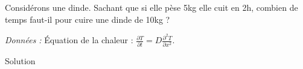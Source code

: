 \begin{Exercise}[title=Temps de cuisson d'une dinde]
  Considérons une dinde. Sachant que si elle pèse 5kg elle cuit en 2h, combien de temps faut-il pour cuire une dinde de 10kg ?

			\emph{Données :} Équation de la chaleur : $\frac{\partial T}{\partial t} = D \frac{\partial^2 T}{\partial x^2}$.

\end{Exercise}
\begin{Answer}
  Solution
\end{Answer}
